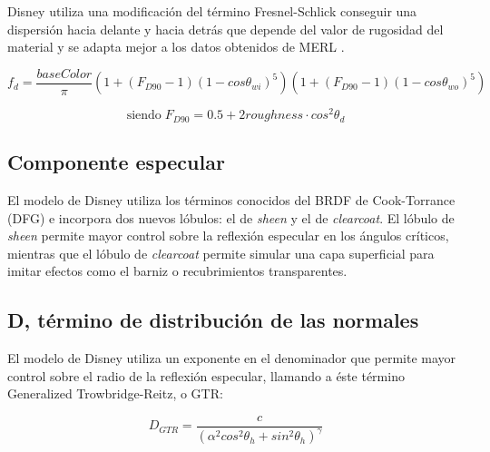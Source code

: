         Disney \autocite{disney12} utiliza una modificaci\'on del t\'ermino Fresnel-Schlick
        conseguir una dispersi\'on hacia delante y hacia detr\'as que depende del valor de rugosidad del material y se
        adapta mejor a los datos obtenidos de MERL \autocite{merl}.
    
    
        $$
        f_d = \frac{baseColor}{\pi}
        \left(  1 + (F_{D90} - 1)(1 - cos\theta_{wi})^5  \right)
        \left(  1 + (F_{D90} - 1)(1 - cos\theta_{wo})^5  \right)
        $$
    
        \begin{equation}
        \textrm{siendo} \; F_{D90} = 0.5 + 2roughness\cdot{cos^2\theta_d}
        \end{equation}
    
        \singlespacing
        \subsection{Componente especular}
        El modelo de Disney \autocite{disney12} utiliza los t\'erminos conocidos del BRDF de Cook-Torrance \autocite{cooktorrance}
        (DFG) e incorpora dos nuevos l\'obulos: el de \textit{sheen} y el de \textit{clearcoat}. El l\'obulo de \textit{sheen}
        permite mayor control sobre la reflexi\'on especular en los \'angulos cr\'iticos, mientras que el l\'obulo de
        \textit{clearcoat} permite simular una capa superficial para imitar efectos como el barniz o recubrimientos
        transparentes.

            \subsection*{D, t\'ermino de distribuci\'on de las normales}
                El modelo de Disney utiliza un exponente en el denominador que permite mayor control sobre el radio de la reflexi\'on
                especular, llamando a \'este t\'ermino Generalized Trowbridge-Reitz, o GTR:

                \begin{equation}
                    D_{GTR} = \frac
                    {c}
                    {(\alpha^2 cos^2 \theta_h + sin^2 \theta_h)^\gamma}
                \end{equation}
                \singlespacing

